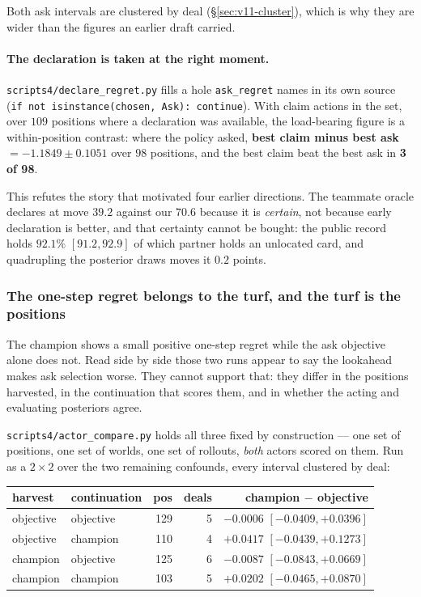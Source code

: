 \documentclass[11pt,letterpaper]{article}
\begin{document}
Both ask intervals are clustered by deal (\S\ref{sec:v11-cluster}), which is
why they are wider than the figures an earlier draft carried.

\paragraph{The declaration is taken at the right moment.}
\texttt{scripts4/declare\_regret.py} fills a hole \texttt{ask\_regret} names in
its own source (\texttt{if not isinstance(chosen, Ask): continue}). With claim
actions in the set, over $109$ positions where a declaration was available,
the load-bearing figure is a within-position contrast: where the policy asked,
\textbf{best claim minus best ask $= -1.1849 \pm 0.1051$} over $98$ positions,
and the best claim beat the best ask in \textbf{3 of 98}.

This refutes the story that motivated four earlier directions. The teammate
oracle declares at move $39.2$ against our $70.6$ because it is \emph{certain},
not because early declaration is better, and that certainty cannot be
bought: the public record holds $92.1\%$ $[91.2, 92.9]$ of which partner holds
an unlocated card, and quadrupling the posterior draws moves it $0.2$ points.

\subsubsection{The one-step regret belongs to the turf, and the turf is the positions}

The champion shows a small positive one-step regret while the ask objective
alone does not. Read side by side those two runs appear to say the lookahead
makes ask selection worse. They cannot support that: they differ in the
positions harvested, in the continuation that scores them, and in whether the
acting and evaluating posteriors agree.

\texttt{scripts4/actor\_compare.py} holds all three fixed by construction ---
one set of positions, one set of worlds, one set of rollouts, \emph{both}
actors scored on them. Run as a $2\times2$ over the two remaining confounds,
every interval clustered by deal:

\begin{center}\small
\begin{tabular}{@{}llrrr@{}}
\toprule
harvest & continuation & pos & deals & champion $-$ objective \\
\midrule
objective & objective & 129 & 5 & $-0.0006$ $[-0.0409, +0.0396]$ \\
objective & champion  & 110 & 4 & $+0.0417$ $[-0.0439, +0.1273]$ \\
champion  & objective & 125 & 6 & $-0.0087$ $[-0.0843, +0.0669]$ \\
champion  & champion  & 103 & 5 & $+0.0202$ $[-0.0465, +0.0870]$ \\
\bottomrule
\end{tabular}
\end{center}
\end{document}

